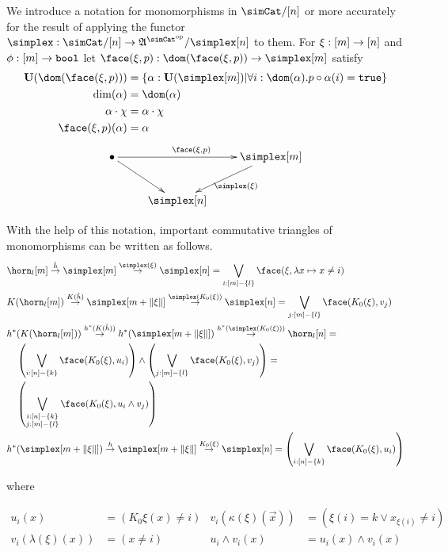 \documentclass[csh.tex]{subfiles}
\begin{document}
\begin{definition} We introduce a notation for monomorphisms in $\simCat/[n]$ or more accurately for the result of applying the functor $\simplex\of \simCat/[n] \to \ambient\s/\simplex[n]$ to them. For $\xi:[m]\to[n]$ and $\phi:[m]\to\mathtt{bool}$ let $\face(\xi,p)\of \dom(\face(\xi,p))\to \simplex[m]$ satisfy
\begin{align*}
\base(\dom(\face(\xi,p))) &= \set{\alpha\of\base(\simplex[m])\middle|\forall i\of \dom(\alpha).p\circ\alpha(i)=\true}\\
\dim(\alpha) &= \dom(\alpha)\\
\alpha\cdot\chi &= \alpha\cdot\chi\\
\face(\xi,p)(\alpha) &= \alpha
\end{align*}
\[\xymatrix{
\bullet\ar[rr]^{\face(\xi,p)}\ar[dr] && \simplex[m]\ar[dl]^{\simplex(\xi)} \\
& \simplex[n]
}\]
\end{definition}

With the help of this notation, important commutative triangles of monomorphisms can be written as follows.
\begin{align}
&\horn_l[m]\stackrel{\hat h}\to \simplex[m]\stackrel{\simplex(\xi)}\to \simplex[n] = \bigvee_{i\of [m]-\set l} \face(\xi,\function x{x\neq i})\\
&K(\horn_l[m])\stackrel{K(\hat h)}\to \simplex[m+\norm\xi]\stackrel{\simplex(K_0(\xi))}\to \simplex[n] = \bigvee_{j\of [m]-\set l} \face(K_0(\xi),v_j)\\
&h\ri(K(\horn_l[m]))\stackrel{h\ri(K(\hat h))}\to h\ri(\simplex[m+\norm\xi])\stackrel{h\ri(\simplex(K_0(\xi)))}\to \horn_l[n] = \\
&\quad\left(\bigvee_{i\of[n]-\set k} \face(K_0(\xi),u_i)\right)\wedge\left(\bigvee_{j\of [m]-\set l} \face(K_0(\xi),v_j)\right)=\\
&\quad\left(\bigvee_{\substack{i\of[n]-\set k\\j\of [m]-\set l}}\face(K_0(\xi),u_i\land v_j)\right)\\
&h\ri(\simplex[m+\norm\xi])\stackrel{h}\to \simplex[m+\norm\xi]\stackrel{K_0(\xi)}\to \simplex[n] =\left(\bigvee_{i\of[n]-\set k} \face(K_0(\xi),u_i)\right)
\end{align}
\begin{center}
where
\end{center}
\begin{align*}
u_i(x) &= (K_0\xi(x)\neq i) & 
v_i(\kappa(\xi)(\vec x)) &= (\xi(i)= k\vee x_{\xi(i)}\neq i)\\
v_i(\lambda(\xi)(x)) &= (x\neq i)&
u_i\land v_i(x) &= u_i(x)\land v_i(x)
\end{align*}
\end{document}
